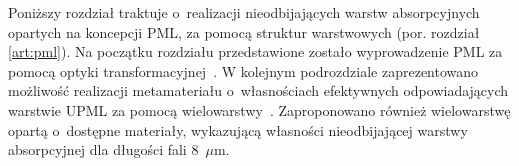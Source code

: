Poniższy rozdział traktuje o~realizacji nieodbijających warstw absorpcyjnych opartych na koncepcji PML, za pomocą struktur warstwowych (por. rozdział \ref{art:pml}). Na początku rozdziału przedstawione zostało wyprowadzenie PML za pomocą optyki transformacyjnej~\cite{pendry2012transformation}. W kolejnym podrozdziale zaprezentowano możliwość realizacji metamateriału o~własnościach efektywnych odpowiadających warstwie UPML za pomocą wielowarstwy~\cite{ania2015}. Zaproponowano również wielowarstwę opartą o~dostępne materiały, wykazującą własności nieodbijającej warstwy absorpcyjnej dla długości fali $8$~$\mu$m.



